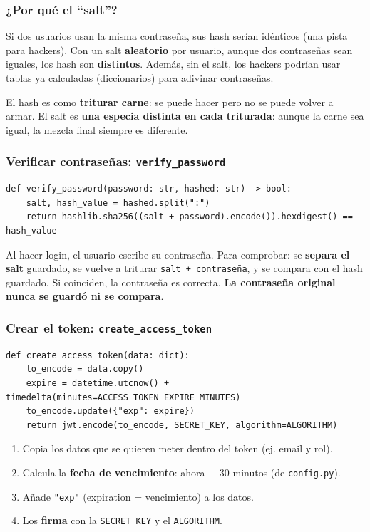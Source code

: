 \documentclass[11pt,a4paper]{article}
\begin{document}
\subsubsection{¿Por qué el ``salt''?}

Si dos usuarios usan la misma contraseña, sus hash serían idénticos (una pista para hackers).
Con un salt \textbf{aleatorio} por usuario, aunque dos contraseñas sean iguales, los hash son
\textbf{distintos}. Además, sin el salt, los hackers podrían usar tablas ya calculadas
(diccionarios) para adivinar contraseñas.

\begin{analogia}
El hash es como \textbf{triturar carne}: se puede hacer pero no se puede volver a armar.
El salt es \textbf{una especia distinta en cada triturada}: aunque la carne sea igual,
la mezcla final siempre es diferente.
\end{analogia}

\subsubsection{Verificar contraseñas: \texttt{verify\_password}}

\begin{lstlisting}
def verify_password(password: str, hashed: str) -> bool:
    salt, hash_value = hashed.split(":")
    return hashlib.sha256((salt + password).encode()).hexdigest() == hash_value
\end{lstlisting}

Al hacer login, el usuario escribe su contraseña. Para comprobar: se \textbf{separa el salt}
guardado, se vuelve a triturar \texttt{salt + contraseña}, y se compara con el hash guardado.
Si coinciden, la contraseña es correcta. \textbf{La contraseña original nunca se guardó ni se compara}.

\subsubsection{Crear el token: \texttt{create\_access\_token}}

\begin{lstlisting}
def create_access_token(data: dict):
    to_encode = data.copy()
    expire = datetime.utcnow() + timedelta(minutes=ACCESS_TOKEN_EXPIRE_MINUTES)
    to_encode.update({"exp": expire})
    return jwt.encode(to_encode, SECRET_KEY, algorithm=ALGORITHM)
\end{lstlisting}

\begin{enumerate}
    \item Copia los datos que se quieren meter dentro del token (ej. email y rol).
    \item Calcula la \textbf{fecha de vencimiento}: ahora + 30 minutos (de \texttt{config.py}).
    \item Añade \texttt{"exp"} (expiration = vencimiento) a los datos.
    \item Los \textbf{firma} con la \texttt{SECRET\_KEY} y el \texttt{ALGORITHM}.
\end{enumerate}
\end{document}
